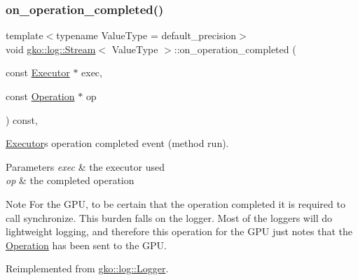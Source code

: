 \subsubsection{\texorpdfstring{on\+\_\+operation\+\_\+completed()}{on\_operation\_completed()}}
{\footnotesize\ttfamily template$<$typename Value\+Type  = default\+\_\+precision$>$ \\
void \hyperlink{classgko_1_1log_1_1Stream}{gko\+::log\+::\+Stream}$<$ Value\+Type $>$\+::on\+\_\+operation\+\_\+completed (\begin{DoxyParamCaption}\item[{const \hyperlink{classgko_1_1Executor}{Executor} $\ast$}]{exec,  }\item[{const \hyperlink{classgko_1_1Operation}{Operation} $\ast$}]{op }\end{DoxyParamCaption}) const\hspace{0.3cm}{\ttfamily [override]}, {\ttfamily [virtual]}}



\hyperlink{classgko_1_1Executor}{Executor}\textquotesingle{}s operation completed event (method run). 


\begin{DoxyParams}{Parameters}
{\em exec} & the executor used \\
\hline
{\em op} & the completed operation\\
\hline
\end{DoxyParams}
\begin{DoxyNote}{Note}
For the G\+PU, to be certain that the operation completed it is required to call synchronize. This burden falls on the logger. Most of the loggers will do lightweight logging, and therefore this operation for the G\+PU just notes that the \hyperlink{classgko_1_1Operation}{Operation} has been sent to the G\+PU. 
\end{DoxyNote}


Reimplemented from \hyperlink{classgko_1_1log_1_1Logger}{gko\+::log\+::\+Logger}.

\mbox{\label{classgko_1_1log_1_1Stream_a0c9edcd1ec0e4483ace5effdefa7e1f5}} 
